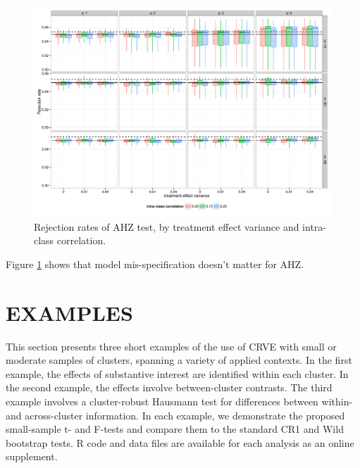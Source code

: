 \documentclass[12pt]{article}\usepackage[]{graphicx}\usepackage[]{color}
\newenvironment{knitrout}{}{} %
\begin{document}
\begin{knitrout}
\color{fgcolor}\begin{figure}

{\centering \includegraphics[width=\linewidth]{CR_fig/misspecification-1} 

}

\caption[Rejection rates of AHZ test, by treatment effect variance and intra-class correlation]{Rejection rates of AHZ test, by treatment effect variance and intra-class correlation.}\label{fig:misspecification}
\end{figure}


\end{knitrout}

Figure \ref{fig:misspecification} shows that model mis-specification doesn't matter for AHZ. 

\section{EXAMPLES}
\label{subsec:examples_F}

This section presents three short examples of the use of CRVE with small or moderate samples of clusters, spanning a variety of applied contexts. 
In the first example, the effects of substantive interest are identified within each cluster. 
In the second example, the effects involve between-cluster contrasts. 
The third example involves a cluster-robust Hausmann test for differences between within- and across-cluster information. 
In each example, we demonstrate the proposed small-sample t- and F-tests and compare them to the standard CR1 and Wild bootstrap tests. 
R code and data files are available for each analysis as an online supplement.
\end{document}
